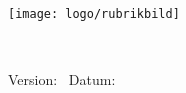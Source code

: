 \documentclass[10pt,swedish,a4paper]{report} %
\begin{document}
\pagestyle{empty}
\vfill
\vspace*{4cm}
\centerline{\texttt{[image: logo/rubrikbild]}}
\begin{flushright}
	\Huge{\bfseries{\TitleText}} \\[3mm]
	\Large{\bfseries{\SubtitleText}}
\end{flushright}

\vfill
\listoftodos
\vfill

Version: \DokVersion\ \hfill \Initialer \hfill Datum: \DokumentDatum

\newpage


\pagestyle{fancy}
\lhead{\leftmark}
\chead{}
\lfoot{\scriptsize \Linkhome}
\cfoot{\scriptsize \thepage\ / \pageref{LastPage}}
\rfoot{\scriptsize \Epostadress}

\renewcommand{\footrulewidth}{0.2pt}



\cleardoublepage

\tableofcontents

\newpage

\setlength{\parskip}{0.5em}
\setlength{\parindent}{0pt}







\end{document}

